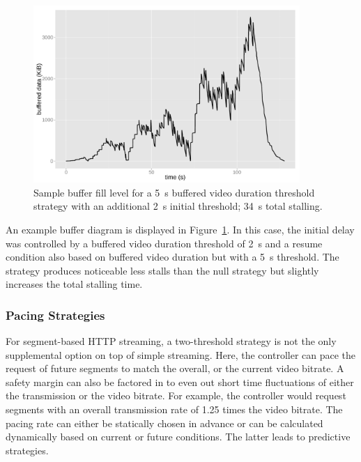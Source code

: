 \begin{figure}[htb]
	\centering
	\includegraphics[width=0.9\textwidth]{images/R-bufferlevel-flash.pdf}
	\caption{Sample buffer fill level for a \SI{5}{\second} buffered video duration threshold strategy with an additional \SI{2}{\second} initial threshold; \SI{34}{\second} total stalling.}
\label{c3:fig:bufferlevel-flash}
\end{figure}

An example buffer diagram is displayed in Figure~\ref{c3:fig:bufferlevel-flash}. In this case, the initial delay was controlled by a buffered video duration threshold of \SI{2}{\second} and a resume condition also based on buffered video duration but with a \SI{5}{\second} threshold. The strategy produces noticeable less stalls than the null strategy but slightly increases the total stalling time.


\subsubsection{Pacing Strategies}

For segment-based \gls{HTTP} streaming, a two-threshold strategy is not the only supplemental option on top of simple streaming. Here, the controller can pace the request of future segments to match the overall, or the current video bitrate. A safety margin can also be factored in to even out short time fluctuations of either the transmission or the video bitrate. For example, the controller would request segments with an overall transmission rate of 1.25 times the video bitrate. The pacing rate can either be statically chosen in advance or can be calculated dynamically based on current or future conditions. The latter leads to predictive strategies.


